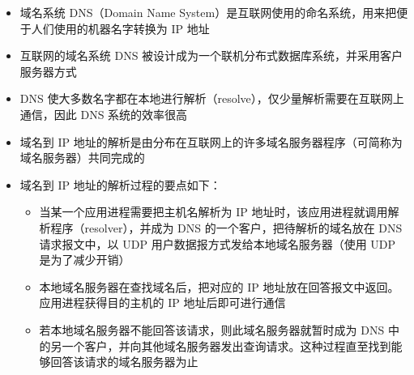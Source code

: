 \documentclass[cs4size,a4paper,10pt]{ctexart}
\begin{document}
	\begin{itemize}
		\item 域名系统 DNS（Domain Name System）是互联网使用的命名系统，用来把便于人们使用的机器名字转换为 IP 地址
		\item 互联网的域名系统 DNS 被设计成为一个联机分布式数据库系统，并采用客户服务器方式
		\item DNS 使大多数名字都在本地进行解析（resolve），仅少量解析需要在互联网上通信，因此 DNS 系统的效率很高
		\item 域名到 IP 地址的解析是由分布在互联网上的许多域名服务器程序（可简称为域名服务器）共同完成的
		\item 域名到 IP 地址的解析过程的要点如下：
		\begin{itemize}
			\item 当某一个应用进程需要把主机名解析为 IP 地址时，该应用进程就调用解析程序（resolver），并成为 DNS 的一个客户，把待解析的域名放在 DNS 请求报文中，以 UDP 用户数据报方式发给本地域名服务器（使用 UDP 是为了减少开销）
			\item 本地域名服务器在查找域名后，把对应的 IP 地址放在回答报文中返回。应用进程获得目的主机的 IP 地址后即可进行通信
			\item 若本地域名服务器不能回答该请求，则此域名服务器就暂时成为 DNS 中的另一个客户，并向其他域名服务器发出查询请求。这种过程直至找到能够回答该请求的域名服务器为止
		\end{itemize}
	\end{itemize}
\end{document}
